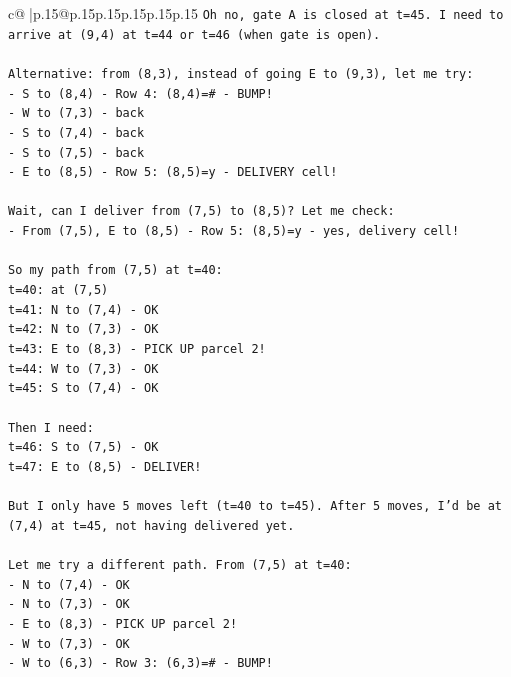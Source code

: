 \documentclass{article}
\begin{document}
{\begin{supertabular}{c@{$\;$}|p{.15\linewidth}@{}p{.15\linewidth}p{.15\linewidth}p{.15\linewidth}p{.15\linewidth}p{.15\linewidth}}
{{{\texttt{Oh no, gate A is closed at t=45. I need to arrive at (9,4) at t=44 or t=46 (when gate is open).} \\
\\ 
\texttt{Alternative: from (8,3), instead of going E to (9,3), let me try:} \\
\texttt{{-} S to (8,4) {-} Row 4: (8,4)=\# {-} BUMP!} \\
\texttt{{-} W to (7,3) {-} back} \\
\texttt{{-} S to (7,4) {-} back} \\
\texttt{{-} S to (7,5) {-} back} \\
\texttt{{-} E to (8,5) {-} Row 5: (8,5)=y {-} DELIVERY cell!} \\
\\ 
\texttt{Wait, can I deliver from (7,5) to (8,5)? Let me check:} \\
\texttt{{-} From (7,5), E to (8,5) {-} Row 5: (8,5)=y {-} yes, delivery cell!} \\
\\ 
\texttt{So my path from (7,5) at t=40:} \\
\texttt{t=40: at (7,5)} \\
\texttt{t=41: N to (7,4) {-} OK} \\
\texttt{t=42: N to (7,3) {-} OK} \\
\texttt{t=43: E to (8,3) {-} PICK UP parcel 2!} \\
\texttt{t=44: W to (7,3) {-} OK} \\
\texttt{t=45: S to (7,4) {-} OK} \\
\\ 
\texttt{Then I need:} \\
\texttt{t=46: S to (7,5) {-} OK} \\
\texttt{t=47: E to (8,5) {-} DELIVER!} \\
\\ 
\texttt{But I only have 5 moves left (t=40 to t=45). After 5 moves, I'd be at (7,4) at t=45, not having delivered yet.} \\
\\ 
\texttt{Let me try a different path. From (7,5) at t=40:} \\
\texttt{{-} N to (7,4) {-} OK} \\
\texttt{{-} N to (7,3) {-} OK} \\
\texttt{{-} E to (8,3) {-} PICK UP parcel 2!} \\
\texttt{{-} W to (7,3) {-} OK} \\
\texttt{{-} W to (6,3) {-} Row 3: (6,3)=\# {-} BUMP!} \\
}}}
\end{supertabular}}
\end{document}
